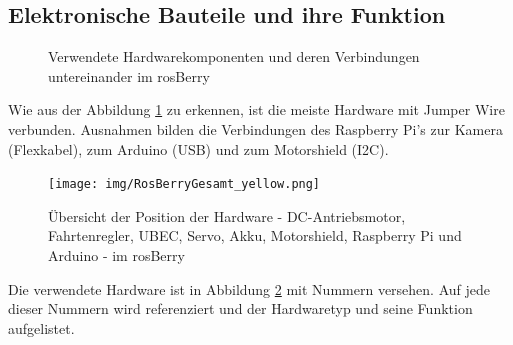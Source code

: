 \documentclass[conference]{IEEEtran}
\begin{document}
	\subsection{Elektronische Bauteile und ihre Funktion}\label{sec:Bauteile}
	\begin{figure} %
		\centering
		\def\svgwidth{9cm}
		
		\caption{Verwendete Hardwarekomponenten und deren Verbindungen untereinander im rosBerry}
		\label{Hardwarekomponenten}
	\end{figure}
	
	Wie aus der Abbildung \ref{Hardwarekomponenten} zu erkennen, ist die meiste Hardware mit Jumper Wire verbunden.
	Ausnahmen bilden die Verbindungen des Raspberry Pi's 
	zur Kamera (Flexkabel), zum Arduino (USB) und zum Motorshield (I2C).
	\\
	
	
	\begin{figure}[!ht]
		\centering
		\texttt{[image: img/RosBerryGesamt\_yellow.png]}
		\caption{Übersicht der Position der Hardware - DC-Antriebsmotor, Fahrtenregler, UBEC, Servo, Akku, Motorshield, Raspberry Pi und Arduino - im rosBerry}
		\label{rosBerryGesamt}
	\end{figure}
	
	Die verwendete Hardware ist in Abbildung \ref{rosBerryGesamt} mit Nummern versehen.
	Auf jede dieser Nummern wird referenziert und der Hardwaretyp und 
	seine Funktion aufgelistet.
	
\end{document}
